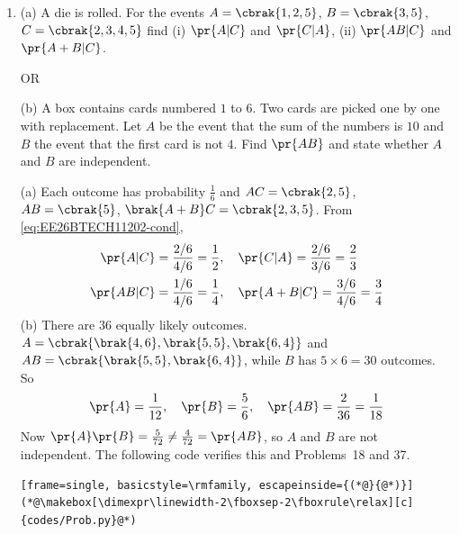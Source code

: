 \begin{enumerate}[label=\thesubsection.\arabic*, ref=\thesubsection.\theenumi, start=26]
(b) If $\vec{a}, \vec{b}, \vec{c}$ are unit vectors, prove that $\norm{\vec{a}-\vec{b}}^2 + \norm{\vec{b}-\vec{c}}^2 + \norm{\vec{c}-\vec{a}}^2 \le 9$.
\par\solution
(a) From \eqref{eq:EE26BTECH11202-collinear},
\begin{align}
	\mydet{\vec{B}-\vec{A} & \vec{C}-\vec{A}} = \mydet{-50 & a-55 \\ 10 & -50}
	= 2500 - 10\brak{a-55} = 0 \implies a = 305
\end{align}
(b) Let $s = \vec{a}^{\top}\vec{b} + \vec{b}^{\top}\vec{c} + \vec{c}^{\top}\vec{a}$. Since the vectors are unit vectors, from \eqref{eq:EE26BTECH11202-norm-id},
\begin{align}
	\norm{\vec{a}-\vec{b}}^2 + \norm{\vec{b}-\vec{c}}^2 + \norm{\vec{c}-\vec{a}}^2 = 6 - 2s
\end{align}
But
\begin{align}
	0 \le \norm{\vec{a}+\vec{b}+\vec{c}}^2 = 3 + 2s \implies s \ge -\frac{3}{2}
\end{align}
Therefore
\begin{align}
	6 - 2s \le 6 + 3 = 9
\end{align}

\item 
(a) A die is rolled. For the events $A = \cbrak{1,2,5}$, $B = \cbrak{3,5}$, $C = \cbrak{2,3,4,5}$ find (i) $\pr{A\vert C}$ and $\pr{C\vert A}$, (ii) $\pr{AB\vert C}$ and $\pr{A+B\vert C}$.

OR

(b) A box contains cards numbered $1$ to $6$. Two cards are picked one by one with replacement. Let $A$ be the event that the sum of the numbers is $10$ and $B$ the event that the first card is not $4$. Find $\pr{AB}$ and state whether $A$ and $B$ are independent.
\par\solution
(a) Each outcome has probability $\frac{1}{6}$ and $AC = \cbrak{2,5}$, $AB = \cbrak{5}$, $\brak{A+B}C = \cbrak{2,3,5}$. From \eqref{eq:EE26BTECH11202-cond},
\begin{align}
	\pr{A\vert C} &= \frac{2/6}{4/6} = \frac{1}{2}, \quad
	\pr{C\vert A} = \frac{2/6}{3/6} = \frac{2}{3}
	\\
	\pr{AB\vert C} &= \frac{1/6}{4/6} = \frac{1}{4}, \quad
	\pr{A+B\vert C} = \frac{3/6}{4/6} = \frac{3}{4}
\end{align}
(b) There are $36$ equally likely outcomes. $A = \cbrak{\brak{4,6},\brak{5,5},\brak{6,4}}$ and $AB = \cbrak{\brak{5,5},\brak{6,4}}$, while $B$ has $5 \times 6 = 30$ outcomes. So
\begin{align}
	\pr{A} = \frac{1}{12}, \quad \pr{B} = \frac{5}{6}, \quad \pr{AB} = \frac{2}{36} = \frac{1}{18}
\end{align}
Now $\pr{A}\pr{B} = \frac{5}{72} \ne \frac{4}{72} = \pr{AB}$, so $A$ and $B$ are not independent.
The following code verifies this and Problems~18 and 37.
\begin{lstlisting}[frame=single, basicstyle=\rmfamily, escapeinside={(*@}{@*)}]
(*@\makebox[\dimexpr\linewidth-2\fboxsep-2\fboxrule\relax][c]{codes/Prob.py}@*)
\end{lstlisting}
\end{enumerate}

